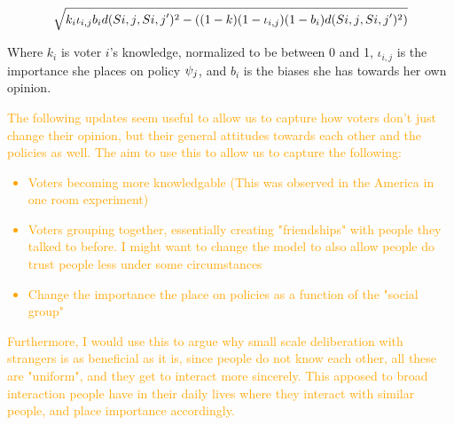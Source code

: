 \begin{equation} \label{eq:abm_update_function} \sqrt{k_{i}\iota_{i,j}
b_{i}d(S{i,j}, S{i,j}')^{2} -
((1-k)(1-\iota_{i,j})(1-b_{i})d(S{i,j}, S{i,j}')^{2})}
\end{equation}

Where $k_{i}$ is voter $i$'s knowledge, normalized to be between 0 and 1,
$\iota_{i,j}$ is the importance she places on policy $\psi_{j}$, and $b_{i}$
is the biases she has towards her own opinion.

\textcolor{orange}{The following updates seem useful to allow us to capture how
voters don't just change their opinion, but their general attitudes towards
each other and the policies as well. The aim to use this to allow us to capture
the following:} \textcolor{orange}{ \begin{itemize} \item Voters becoming more
		knowledgable (This was observed in the America in one room
		experiment) \item Voters grouping together, essentially
		creating "friendships" with people they talked to before. I
		might want to change the model to also allow people do trust
		people less under some circumstances \item Change the
importance the place on policies as a function of the "social group"
\end{itemize}}

\textcolor{orange}{ Furthermore, I would use this to argue why small scale
	deliberation with strangers is as beneficial as it is, since people do
	not know each other, all these are "uniform", and they get to interact
	more sincerely. This apposed to broad interaction people have in their
	daily lives where they interact with similar people, and place
	importance accordingly. }

